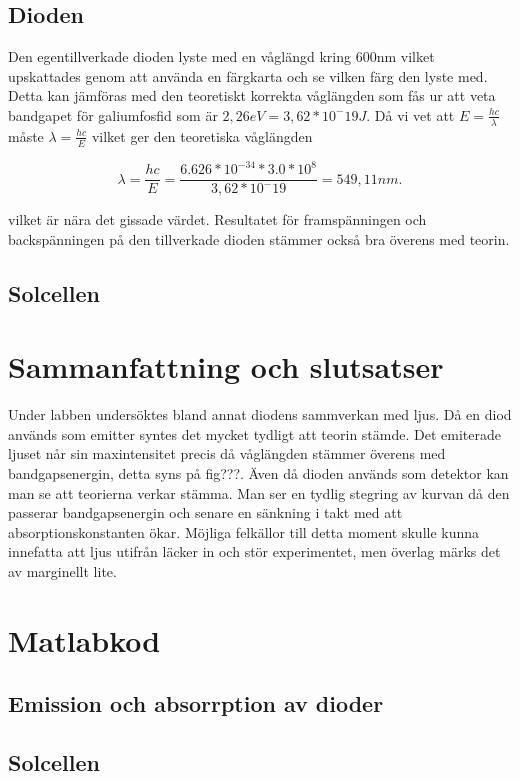 \documentclass[a4paper]{article}
\begin{document}
\subsection{Dioden}
Den egentillverkade dioden lyste med en våglängd kring 600nm vilket upskattades genom att använda en färgkarta och se vilken färg den lyste med. Detta kan jämföras med den teoretiskt korrekta våglängden som fås ur att veta bandgapet för galiumfosfid som är $2,26eV = 3,62*10^-19J$. Då vi vet att $E = \frac{hc}{\lambda}$ måste $\lambda = \frac{hc}{E}$ vilket ger den teoretiska våglängden

\begin{equation}
	\lambda = \frac{hc}{E} = \frac{6.626*10^{-34} * 3.0*10^8}{3,62*10^-19} = 549,11 nm.
\end{equation}

vilket är nära det gissade värdet. Resultatet för framspänningen och backspänningen på den tillverkade dioden stämmer också bra överens med teorin.

\subsection{Solcellen}

\section{Sammanfattning och slutsatser}
Under labben undersöktes bland annat diodens sammverkan med ljus. Då en diod används som emitter syntes det mycket tydligt att teorin stämde. Det emiterade ljuset når sin maxintensitet precis då våglängden stämmer överens med bandgapsenergin, detta syns på fig???. Även då dioden används som detektor kan man se att teorierna verkar stämma. Man ser en tydlig stegring av kurvan då den passerar bandgapsenergin och senare en sänkning i takt med att absorptionskonstanten ökar. Möjliga felkällor till detta moment skulle kunna innefatta att ljus utifrån läcker in och stör experimentet, men överlag märks det av marginellt lite. 

\newpage
\appendix
\section{Matlabkod}
\subsection{Emission och absorrption av dioder}

\subsection{Solcellen}

\end{document}
